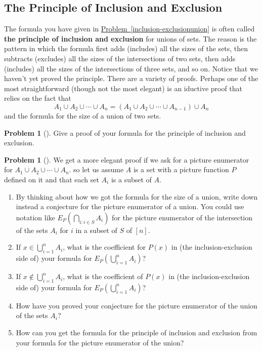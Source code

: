 \documentclass[10pt,]{book}
\newcommand{\terminology}[1]{\textbf{#1}}
\theoremstyle{plain}
\theoremstyle{definition}
\newtheorem{activity}[project]{Problem}
\theoremstyle{definition}
\numberwithin{equation}{chapter}
\begin{document}
\subsection[{The Principle of Inclusion and Exclusion}]{The Principle of Inclusion and Exclusion}\label{subsection-53}
The formula you have given in \hyperref[inclusion-exclusionunion]{Problem~\ref{inclusion-exclusionunion}} is often called \terminology{the principle of inclusion and exclusion} for unions of sets. The reason is the pattern in which the formula first adds (includes) all the sizes of the sets, then subtracts (excludes) all the sizes of the intersections of two sets, then adds (includes) all the sizes of the intersections of three sets, and so on.   Notice that we haven't yet proved the principle. There are a variety of proofs.  Perhaps one of the most straightforward (though not the most elegant) is an iductive proof that relies on the fact that%
\begin{equation*}
A_1 \cup A_2 \cup \cdots \cup A_n = \left(A_1 \cup A_2 \cup \cdots \cup A_{n-1}\right) \cup A_n
\end{equation*}
and the formula for the size of a union of two sets.%
\begin{activity}[]\marginsymbol[-1em]{} \label{activity-232}
Give a proof of your formula for the principle of inclusion and exclusion.%
\end{activity}
\begin{activity}[]\marginsymbol[-1em]{} \label{activity-233}
We get a more elegant proof if we ask for a picture enumerator for \(A_1 \cup A_2 \cup \cdots \cup A_n\).  so let us assume \(A\) is a set with a picture function \(P\) defined on it and that each set \(A_i\) is a subset of \(A\).%
\begin{enumerate}[font=\bfseries,label=(\alph*),ref=\alph*]
\item\label{task-173} \marginsymbol[-2.5em]{} By thinking about how we got the formula for the size of a union, write down instead a conjecture for the picture enumerator of a union.  You could use notation like \(E_P(\bigcap_{i:i\in S} A_i)\) for the picture enumerator of the intersection of the sets \(A_i\) for \(i\) in a subset of \(S\) of \([n]\).%
\item\label{task-174} \marginsymbol[-2.5em]{} If \(x \in \bigcup_{i=1}^n A_i\), what is the coefficient for \(P(x)\) in (the inclusion-exclusion side of) your formula for \(E_P(\bigcup_{i=1}^n A_i)\)?%
\item\label{task-175} \marginsymbol[-2.5em]{} If \(x \notin \bigcup_{i=1}^n A_i\), what is the coefficient of \(P(x)\) in (the inclusion-exclusion side of) your formula for \(E_P(\bigcup_{i=1}^n A_i)\)?%
\item\label{task-176} \marginsymbol[-2.5em]{} How have you proved your conjecture for the picture enumerator of the union of the sets \(A_i\)?%
\item\label{task-177} \marginsymbol[-2.5em]{} How can you get the formula for the principle of inclusion and exclusion from your formula for the picture enumerator of the union?%
\end{enumerate}
\end{activity}
\end{document}
